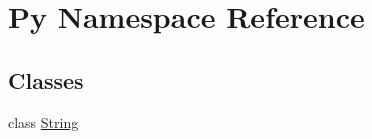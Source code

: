 \hypertarget{namespacePy}{}\section{Py Namespace Reference}
\label{namespacePy}
\subsection*{Classes}
\begin{DoxyCompactItemize}
\item 
class \hyperlink{classPy_1_1String}{String}
\end{DoxyCompactItemize}
